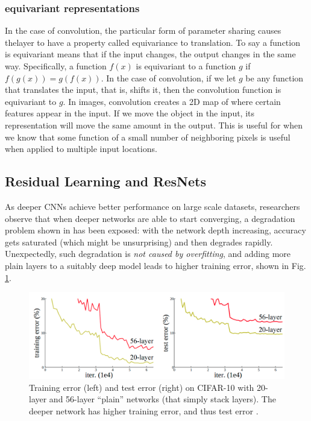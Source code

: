     \subsubsection{equivariant representations}
    In the case of convolution, the particular form of parameter sharing causes thelayer to have a property called equivariance to translation. To say a function is equivariant means that if the input changes, the output changes in the same way. Speciﬁcally, a function $f(x)$ is equivariant to a function $g$ if $f(g(x)) = g(f(x))$. In the case of convolution, if we let $g$ be any function that translates the input, that is, shifts it, then the convolution function is equivariant to $g$. In images, convolution creates a 2D map of where certain features appear in the input. If we move the object in the input, its representation will move the same amount in the output. This is useful for when we know that some function of a small number of neighboring pixels is useful when applied to multiple input locations.
    
    \subsection{Residual Learning and ResNets}
    As deeper CNNs achieve better performance on large scale datasets, researchers observe that when deeper networks are able to start converging, a degradation problem shown in  has been exposed: with the network depth increasing, accuracy gets saturated (which might be
    unsurprising) and then degrades rapidly. Unexpectedly, such degradation is \textit{not caused by overfitting}, and adding more plain layers  to a suitably deep model leads to higher training error, shown in Fig. \ref{fig:ch2-plain-network-error}.
    
     \begin{figure}
    	\centering
    	\includegraphics[width=0.7\columnwidth]{figures/ch2/evaluation-plain-deeper.png}
    	\caption{Training error (left) and test error (right) on CIFAR-10
    		with 20-layer and 56-layer “plain” networks (that
    		simply stack layers). The deeper network
    		has higher training error, and thus test error \cite{He2016Resnet}.
    	}
    	\label{fig:ch2-plain-network-error}
    \end{figure}
    
